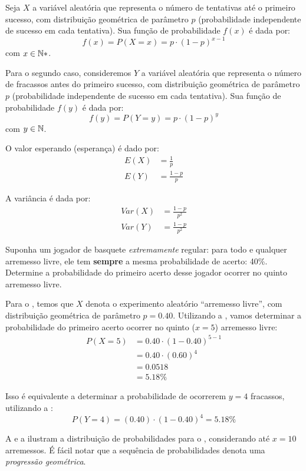 Seja $X$ a variável aleatória que representa o número de tentativas até o
primeiro sucesso, com distribuição geométrica de parâmetro $p$ (probabilidade
independente de sucesso em cada tentativa). Sua função de probabilidade
$f(x)$ é dada por:
\begin{equation}
    f(x) = P(X=x) = p \cdot (1-p)^{x-1}
    \label{eq:dist-geometrica-sucessos}
\end{equation}
com $x \in \mathbb{N}*$.

Para o segundo caso, consideremos $Y$ a variável aleatória que representa o
número de fracassos antes do primeiro sucesso, com distribuição geométrica de
parâmetro $p$ (probabilidade independente de sucesso em cada tentativa). Sua
função de probabilidade $f(y)$ é dada por:
\begin{equation}
    f(y) = P(Y=y) = p \cdot (1-p)^{y}
    \label{eq:dist-geometrica-fracassos}
\end{equation}
com $y \in \mathbb{N}$.

O valor esperando (esperança) é dado por:
\begin{align}
    E(X) &= \frac{1}{p} \\
    E(Y) &= \frac{1-p}{p}
\end{align}

A variância é dada por:
\begin{align}
    Var(X) &= \frac{1-p}{p^2} \\
    Var(Y) &= \frac{1-p}{p^2}
\end{align}

\begin{eg}
Suponha um jogador de basquete \emph{extremamente} regular: para todo e
qualquer arremesso livre, ele tem \textbf{sempre} a mesma probabilidade
de acerto: 40\%. Determine a probabilidade do primeiro acerto desse
jogador ocorrer no quinto arremesso livre.
\label{eg:arremesso-livre}
\end{eg}

\begin{sol}
Para o , temos que $X$ denota o experimento aleatório
``arremesso livre'', com distribuição geométrica de parâmetro $p=0.40$.
Utilizando a , vamos determinar a
probabilidade do primeiro acerto ocorrer no quinto ($x=5$) arremesso livre:
\begin{align*}
P(X=5) &= 0.40 \cdot (1-0.40)^{5-1} \\
       &= 0.40 \cdot (0.60)^{4} \\
       &= 0.0518 \\
       &= 5.18 \%
\end{align*}

Isso é equivalente a determinar a probabilidade de ocorrerem $y=4$ fracassos,
utilizando a :
\[
P(Y=4) = (0.40) \cdot (1-0.40)^{4} = 5.18\%
\]

A  e a
 ilustram a distribuição de probabilidades
para o , considerando até $x=10$ arremessos. É fácil
notar que a sequência de probabilidades denota uma \emph{progressão
geométrica}.
\end{sol}

